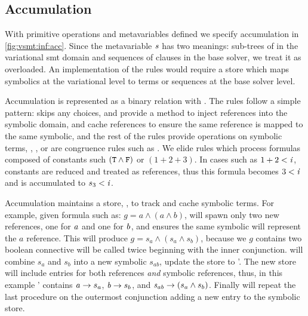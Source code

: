 \subsection{Accumulation}
%
With primitive operations and metavariables defined we specify accumulation in
\autoref{fig:vsmt:inf:acc}. Since the metavariable $\mathit{s}$ has two meanings:
sub-trees of  in the variational \ac{smt} domain and sequences of
clauses in the base solver, we treat it as overloaded.
%
%
An implementation of the rules would require a store which maps symbolics at
the variational level to terms or sequences at the base solver level.

Accumulation is represented as a binary relation with \accumulation{}. The rules
follow a simple pattern:  skips any choices,  and
 provide a method to inject references into the symbolic domain,
 and  cache references to ensure the same
reference is mapped to the same symbolic, and the rest of the rules provide
operations on symbolic terms, \eg{}, , or are congruence rules
such as . We elide rules which process formulas composed of
constants such $\mathit{(\texttt{T}{} \wedge \texttt{F}{})}$ or $(1 + 2 + 3)$. In cases such as
$1 + 2 < \mathit{i}$, constants are reduced and treated as references, thus this
formula becomes $3 < \mathit{i}$ and is accumulated to $s_{3} < \mathit{i}$.

Accumulation maintains a store, \aStore{}, to track and cache symbolic terms.
For example, given formula such as: $g = a \wedge (a \wedge b)$, 
will spawn only two new references, one for $\mathit{a}$ and one for $\mathit{b}$, and
 ensures the same symbolic will represent the $a$ reference. This
will produce $g = s_{a} \wedge (s_{a} \wedge s_{b})$, because we $g$ contains
two boolean connective  will be called twice beginning with the
inner conjunction.  will combine $s_{a}$ and $s_{b}$ into a new
symbolic $s_{ab}$, update the store to \aStore{}'. The new store will include
entries for both references \textit{and} symbolic references, thus, in this
example \aStore{}' contains $\mathit{a} \rightarrow s_{a}$, $\mathit{b} \rightarrow
s_{b}$, and $\mathit{s_{ab}} \rightarrow (s_{a} \wedge s_{b})$. Finally
 will repeat the last procedure on the outermost conjunction
adding a new entry to the symbolic store.


